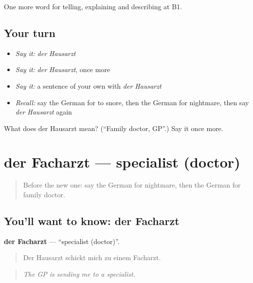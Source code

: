 \begin{grammarlens}[title={What you've built}]
One more word for telling, explaining and describing at B1.
\end{grammarlens}

\subsection*{Your turn}
\begin{itemize}
\raggedright
  \item \emph{Say it:} \emph{der Hausarzt}
  \item \emph{Say it:} \emph{der Hausarzt}, once more
  \item \emph{Say it:} a sentence of your own with \emph{der Hausarzt}
  \item \emph{Recall:} say the German for to snore, then the German for nightmare, then say \emph{der Hausarzt} again
\end{itemize}

\begin{tcolorbox}[breakable,colback=teal!4,colframe=teal!35!black,title={Before you move on}]
What does der Hausarzt mean? (\textquotedblleft{}Family doctor, GP\textquotedblright{}.) Say it once more.
\end{tcolorbox}
\section[der Facharzt]{der Facharzt — specialist (doctor)}

\label{lesson:GE-C487-facharzt}



\begin{quote}
Before the new one: say the German for nightmare, then the German for family doctor.
\end{quote}

\subsection*{You'll want to know: der Facharzt}
\textbf{der Facharzt} — \textquotedblleft{}specialist (doctor)\textquotedblright{}.

\begin{quote}
Der Hausarzt schickt mich zu einem Facharzt.
\end{quote}

\begin{quote}
\emph{The GP is sending me to a specialist.}
\end{quote}

